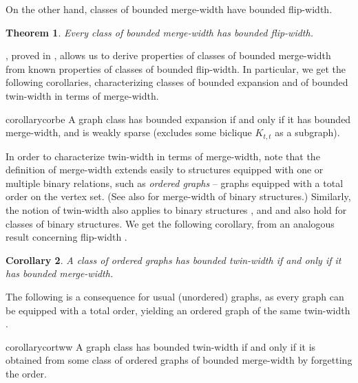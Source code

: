 \documentclass[11pt]{article}
\newtheorem{theorem}{Theorem}[section]
\newtheorem{corollary}[theorem]{Corollary}
\theoremstyle{remark}
\begin{document}

\medskip
On the other hand, classes of bounded merge-width have bounded flip-width.

\begin{theorem}\label{thm:mw-fw}
Every class of bounded merge-width has bounded flip-width.
\end{theorem}
\noindent{}, proved in , allows us to derive properties of classes of bounded merge-width from known properties of classes of bounded flip-width. In particular, we get the following corollaries,
characterizing classes of bounded expansion and of bounded twin-width in terms of merge-width.

\begin{restatable}{corollary}{corbe}\label{cor:be}
  A graph class has bounded expansion if and only if it has bounded merge-width, and is weakly sparse (excludes some biclique $K_{t,t}$ as a subgraph).
\end{restatable}

In order to characterize twin-width in terms of merge-width, note that  the definition of merge-width extends easily to structures equipped with one or multiple binary relations, such as \emph{ordered graphs} --  graphs equipped with a total order on the vertex set. (See also  for merge-width of binary structures.) Similarly, the notion of twin-width also applies to binary structures \cite{tww4}, and  and  also hold for classes of binary structures. We get the following corollary, from an analogous result concerning flip-width \cite[Thm. II.8]{flip-width}.
\begin{corollary}\label{cor:tww-mw-ordered}
  A class of ordered graphs has bounded twin-width if and only if it has bounded merge-width.
\end{corollary}
The following is a consequence for usual (unordered) graphs, as every graph can be equipped with a total order, yielding an ordered graph of the same twin-width \cite{tww4}.

\begin{restatable}{corollary}{cortww}\label{cor:tww-mw}
  A graph class has bounded twin-width if and only if it is obtained
  from some class of {ordered graphs} of bounded merge-width
  by forgetting the order.
\end{restatable}
\end{document}

